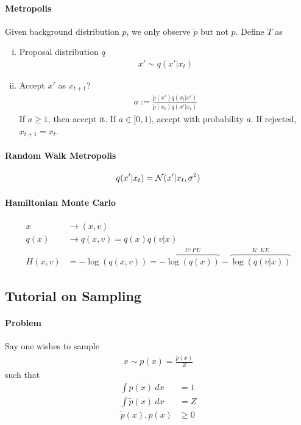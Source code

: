 \documentclass{article}
\begin{document}
	\paragraph{Metropolis} Given background distribution $p$, we only observe $\tilde{p}$ but not $p$. Define $T$ as
	\begin{enumerate}[(i)]
		\item Proposal distribution $q$
		\begin{align}
			x' \sim q(x'|x_t)
		\end{align}
		\item Accept $x'$ as $x_{t+1}$? 
		\begin{align}
			a := \frac{\tilde{p}(x') q(x_t|x')}{\tilde{p}(x_t) q(x'|x_t)}
		\end{align}
		If $a \geq 1$, then accept it. 
		If $a \in [0, 1)$, accept with probability $a$. 
		If rejected, $x_{t+1} = x_t$.
	\end{enumerate}
	
	\paragraph{Random Walk Metropolis}
	\begin{align}
		q(x'|x_t) = \mathcal{{N}} (x'|x_t, \sigma^2)
	\end{align}

	\paragraph{Hamiltonian Monte Carlo}
	\begin{align}
		x &\to (x, v) \\
		q(x) &\to q(x, v) = q(x) q(v|x) \\
		H(x, v) &= - \log(q(x, v)) = - \overbrace{\log(q(x))}^{U: PE} - \overbrace{\log(q(v|x))}^{K: KE}
	\end{align}
	
	\subsection{Tutorial on Sampling}
	\paragraph{Problem} Say one wishes to sample 
	\begin{align}
		x \sim p(x) = \frac{\tilde{p}(x)}{Z}
	\end{align}
	such that
	\begin{align}
		\int p(x)\ dx &= 1 \\
		\int \tilde{p}(x)\ dx &= Z \\
		\tilde{p}(x), p(x) &\geq 0
	\end{align}
\end{document}
